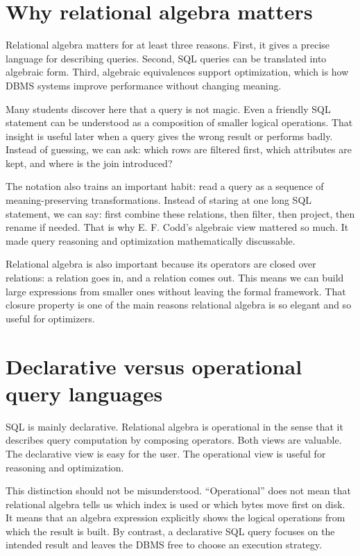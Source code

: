 \documentclass[11pt,a4paper,openany]{book}
\begin{document}
\section{Why relational algebra matters}
Relational algebra matters for at least three reasons. First, it gives a precise language for describing queries. Second, SQL queries can be translated into algebraic form. Third, algebraic equivalences support optimization, which is how DBMS systems improve performance without changing meaning.

Many students discover here that a query is not magic. Even a friendly SQL statement can be understood as a composition of smaller logical operations. That insight is useful later when a query gives the wrong result or performs badly. Instead of guessing, we can ask: which rows are filtered first, which attributes are kept, and where is the join introduced?

The notation also trains an important habit: read a query as a sequence of meaning-preserving transformations. Instead of staring at one long SQL statement, we can say: first combine these relations, then filter, then project, then rename if needed. That is why E. F. Codd's algebraic view mattered so much. It made query reasoning and optimization mathematically discussable.

Relational algebra is also important because its operators are closed over relations: a relation goes in, and a relation comes out. This means we can build large expressions from smaller ones without leaving the formal framework. That closure property is one of the main reasons relational algebra is so elegant and so useful for optimizers.

\section{Declarative versus operational query languages}
SQL is mainly declarative. Relational algebra is operational in the sense that it describes query computation by composing operators. Both views are valuable. The declarative view is easy for the user. The operational view is useful for reasoning and optimization.

This distinction should not be misunderstood. ``Operational'' does not mean that relational algebra tells us which index is used or which bytes move first on disk. It means that an algebra expression explicitly shows the logical operations from which the result is built. By contrast, a declarative SQL query focuses on the intended result and leaves the DBMS free to choose an execution strategy.
\end{document}
